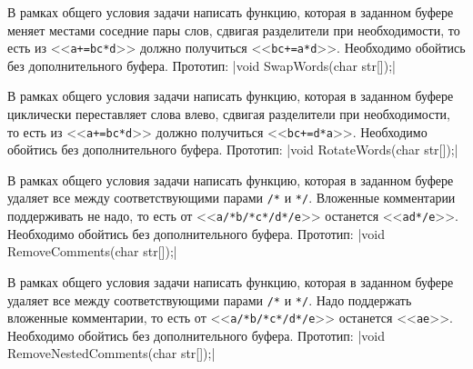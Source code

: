 
\begin{zztask}
В рамках общего условия задачи написать функцию, которая в заданном буфере
меняет местами соседние пары слов, сдвигая разделители при необходимости, то
есть из <<\texttt{a+=bc*d}>> должно получиться <<\texttt{bc+=a*d}>>.
Необходимо обойтись без дополнительного буфера.
%
Прототип: |void SwapWords(char str[]);|
\end{zztask}


\begin{zztask}
В рамках общего условия задачи написать функцию, которая в заданном буфере
циклически переставляет слова влево, сдвигая разделители при необходимости,
то есть из <<\texttt{a+=bc*d}>> должно получиться <<\texttt{bc+=d*a}>>.
Необходимо обойтись без дополнительного буфера.
%
Прототип: |void RotateWords(char str[]);|
\end{zztask}


\begin{zztask}
В рамках общего условия задачи написать функцию, которая в заданном буфере
удаляет все между соответствующими парами \texttt{/*} и \texttt{*/}.
Вложенные комментарии поддерживать не надо, то есть от 
<<\texttt{a/*b/*c*/d*/e}>> останется <<\texttt{ad*/e}>>. 
Необходимо обойтись без дополнительного буфера.
%
Прототип: |void RemoveComments(char str[]);|
\end{zztask}


\begin{zztask}
В рамках общего условия задачи написать функцию, которая в заданном буфере
удаляет все между соответствующими парами \texttt{/*} и \texttt{*/}.
Надо поддержать вложенные комментарии, то есть от 
<<\texttt{a/*b/*c*/d*/e}>> останется <<\texttt{ae}>>. 
Необходимо обойтись без дополнительного буфера.
%
Прототип: |void RemoveNestedComments(char str[]);|
\end{zztask}

